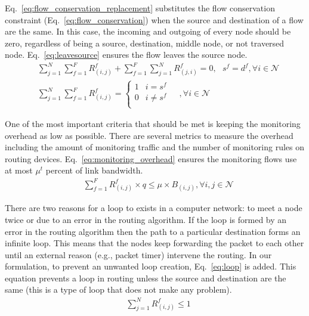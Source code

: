 \documentclass[10pt, journal, letterpaper]{IEEEtran}
\begin{document}
Eq.~\ref{eq:flow_conservation_replacement} substitutes the flow conservation constraint (Eq.~\ref{eq:flow_conservation}) when the source and destination of a flow are the same. In this case, the incoming and outgoing of every node should be zero, regardless of being a source, destination, middle node, or not traversed node. Eq.~\ref{eq:leavesource} ensures the flow leaves the source node.
\begin{align}
    & \sum_{j=1}^N{\sum_{f=1}^F{R_{(i,j)}^{f}}}+\sum_{f=1}^F{\sum_{j=1}^N{R_{(j, i)}^{f}}}= 0,~~~ s^f=d^f, \forall i \in \mathcal{N} \label{eq:flow_conservation_replacement} \\
    & \sum_{j=1}^N{\sum_{f=1}^F{R_{(i,j)}^{f}}} = \begin{cases}
                     1 & i=s^f\\
                     0 & i\neq s^f\\
                    \end{cases}~~~~~,\forall i \in \mathcal{N}\label{eq:leavesource}
\end{align}

One of the most important criteria that should be met is keeping the monitoring overhead as low as possible. There are several metrics to measure the overhead including the amount of monitoring traffic and the number of monitoring rules on routing devices. Eq.~\ref{eq:monitoring_overhead} ensures the monitoring flows use at most $\mu^t$ percent of link bandwidth.
\begin{align}\label{eq:monitoring_overhead}
    & \sum_{f=1}^F{R_{(i,j)}^{f}}\times q\leq \mu\times B_{(i,j)},   \forall i,j \in \mathcal{N}
\end{align}

There are two reasons for a loop to exists in a computer network: to meet a node twice or due to an error in the routing algorithm. If the loop is formed by an error in the routing algorithm then the path to a particular destination forms an infinite loop. This means that the nodes keep forwarding the packet to each other until an external reason (e.g., packet timer) intervene the routing. In our formulation, to prevent an unwanted loop creation, Eq.~\ref{eq:loop} is added. This equation prevents a loop in routing unless the source and destination are the same (this is a type of loop that does not make any problem).
\begin{align}\label{eq:loop}
    & \sum_{j=1}^N{R_{(i,j)}^{f}}\leq 1
\end{align}
\end{document}
